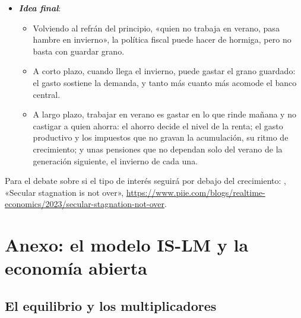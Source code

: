 \documentclass[11pt]{article}
\begin{document}
\begin{itemize}
\begin{itemize}
  \item En el ciclo, conviene dejar actuar a los estabilizadores automáticos, como pide la suavización impositiva; para el largo plazo, proteger la inversión productiva y gravar poco el ahorro y la acumulación.
  \end{itemize}
\item \textbf{\emph{Idea final}}:
  \begin{itemize}
  \item Volviendo al refrán del principio, «quien no trabaja en verano, pasa hambre en invierno», la política fiscal puede hacer de hormiga, pero no basta con guardar grano.

  \item A corto plazo, cuando llega el invierno, puede gastar el grano guardado: el gasto sostiene la demanda, y tanto más cuanto más acomode el banco central.

  \item A largo plazo, trabajar en verano es gastar en lo que rinde mañana y no castigar a quien ahorra: el ahorro decide el nivel de la renta; el gasto productivo y los impuestos que no gravan la acumulación, su ritmo de crecimiento; y unas pensiones que no dependan solo del verano de la generación siguiente, el invierno de cada una.
  \end{itemize}
\end{itemize}

\begin{anotaciones}
Para el debate sobre si el tipo de interés seguirá por debajo del crecimiento: \textcite{Blanchard2023Secular}, «Secular stagnation is not over», \url{https://www.piie.com/blogs/realtime-economics/2023/secular-stagnation-not-over}.
\end{anotaciones}

\clearpage
\appendix

\section{Anexo: el modelo IS-LM y la economía abierta}\label{anexo:islm}

\subsection{El equilibrio y los multiplicadores}
\end{document}
